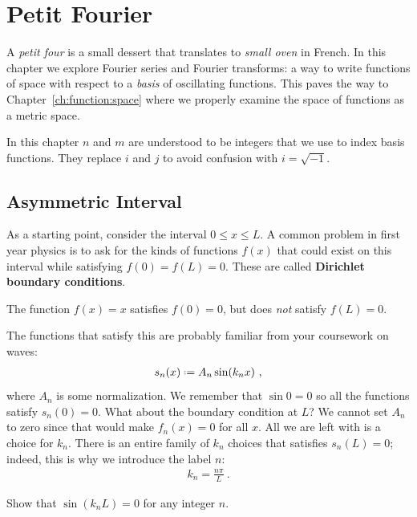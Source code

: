 \documentclass[12pt, oneside]{report}    %
\let\oldsection\section
\def\section{%
  \setcounter{sidenote}{1}%
  \oldsection
}
\begin{document}
\chapter{Petit Fourier}

A \emph{petit four} is a small dessert that translates to \emph{small oven} in French. In this chapter we explore Fourier series and Fourier transforms: a way to write functions of space with respect to a \emph{basis} of oscillating functions. This paves the way to Chapter~\ref{ch:function:space} where we properly examine the space of functions as a metric space.

In this chapter $n$ and $m$ are understood to be integers that we use to index basis functions. They replace $i$ and $j$ to avoid confusion with $i=\sqrt{-1}$. 

\section{Asymmetric Interval}

As a starting point, consider the interval $0 \leq x \leq L$. A common problem in first year physics is to ask for the kinds of functions $f(x)$ that could exist on this interval while satisfying $f(0)=f(L)=0$. These are called \textbf{Dirichlet boundary conditions}. 
\begin{example}
The function $f(x)=x$ satisfies $f(0)=0$, but does \emph{not} satisfy $f(L)=0$. 
\end{example}
The functions that satisfy this are probably familiar from your coursework on waves:
\begin{align}
    s_n(x) \defeq A_n \sin(k_n x) \ ,
\end{align}
where $A_n$ is some normalization. We remember that $\sin 0 = 0$ so all the functions satisfy $s_n(0)=0$. What about the boundary condition at $L$? We cannot set $A_n$ to zero since that would make $f_n(x) = 0$ for all $x$. All we are left with is a choice for $k_n$. There is an entire family of $k_n$ choices that satisfies $s_n(L)=0$; indeed, this is why we introduce the label $n$:
\begin{align}
    k_n = \frac{n\pi}{L} \ .
\end{align}
\begin{exercise}
Show that $\sin(k_n L) = 0$ for any integer $n$. 
\end{exercise}
\end{document}
